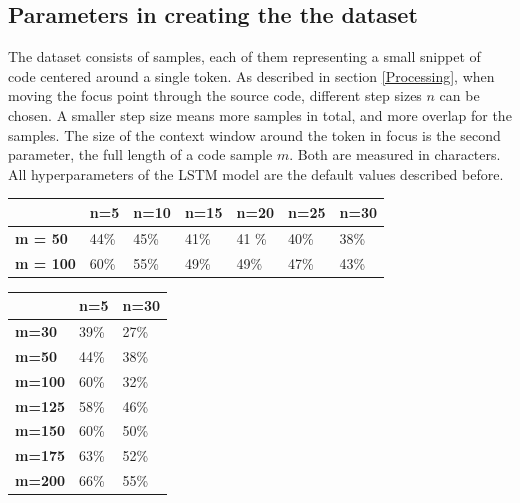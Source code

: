 \documentclass[
	a4paper,
	pagesize,
	pdftex,
	12pt,
	twoside, %
	BCOR=5mm, %
	ngerman,
	fleqn,
	final,
	]{scrartcl}
\begin{document}
\subsection{Parameters in creating the the dataset}

The dataset consists of samples, each of them representing a small snippet of code centered around a single token. As described in section \ref{Processing}, when moving the focus point through the source code, different step sizes $n$ can be chosen. A smaller step size means more samples in total, and more overlap for the samples. The size of the context window around the token in focus is the second parameter, the full length of a code sample $m$. Both are measured in characters. All  hyperparameters of the LSTM model are the default values described before.

\begin{tabular}{|p{2cm}||p{1.7cm}|p{1.7cm}|p{1.7cm}|p{1.7cm}|p{1.7cm}|p{1.7cm}|}
	\hline
	 		& \textbf{n=5} &\textbf{n=10} & \textbf{n=15} & \textbf{n=20} & \textbf{n=25} & \textbf{n=30} \\
	\hline
	 \textbf{m = 50} & 44\% & 45\% &41\% &41 \%& 40\% & 38\% \\ 
	 \textbf{m = 100} & 60\% & 55\% &49\% &49\%&  47\% &43\% \\
	 \hline
	 \hline
\end{tabular}


\begin{tabular}{|p{2cm}||p{1.7cm}|p{1.7cm}|}
	\hline  
				& \textbf{n=5} & \textbf{n=30} \\
				\hline
	\textbf{m=30} & 39\%& 27\% \\ 
	\textbf{m=50} & 44\%& 38\% \\ 
	\textbf{m=100} & 60\%& 32\% \\
	\textbf{m=125} & 58\%&46\% \\
	\textbf{m=150} & 60\%& 50\% \\
	\textbf{m=175} & 63\%&52\% \\
	\textbf{m=200} & 66\%& 55\%\\
	\hline
	\hline
\end{tabular}
\end{document}
